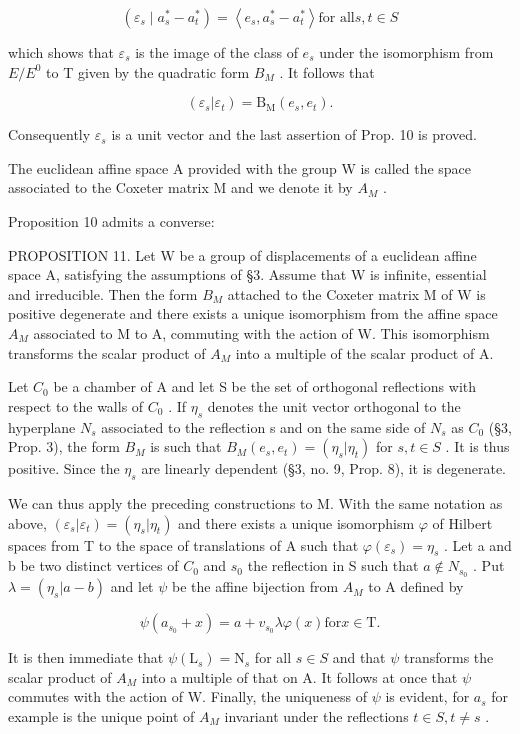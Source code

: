 \[
\left(\varepsilon_ {s} \mid a _ {s} ^ {*} - a _ {t} ^ {*}\right) = \left\langle e _ {s}, a _ {s} ^ {*} - a _ {t} ^ {*} \right\rangle \text {for all} s, t \in S
\]

which shows that \(\varepsilon_{s}\) is the image of the class of \(e_{s}\) under the isomorphism from \(E/E^{0}\) to T given by the quadratic form \(B_{M}\) . It follows that

\[
(\varepsilon_ {s} | \varepsilon_ {t}) = \mathrm{B} _ {\mathrm{M}} (e _ {s}, e _ {t}).
\]

Consequently \(\varepsilon_{s}\) is a unit vector and the last assertion of Prop. 10 is proved.

The euclidean affine space A provided with the group W is called the space associated to the Coxeter matrix M and we denote it by \(A_{M}\) .

Proposition 10 admits a converse:

PROPOSITION 11. Let W be a group of displacements of a euclidean affine space A, satisfying the assumptions of §3. Assume that W is infinite, essential and irreducible. Then the form \(B_{M}\) attached to the Coxeter matrix M of W is positive degenerate and there exists a unique isomorphism from the affine space \(A_{M}\) associated to M to A, commuting with the action of W. This isomorphism transforms the scalar product of \(A_{M}\) into a multiple of the scalar product of A.

Let \(C_0\) be a chamber of A and let S be the set of orthogonal reflections with respect to the walls of \(C_0\) . If \(\eta_s\) denotes the unit vector orthogonal to the hyperplane \(N_s\) associated to the reflection s and on the same side of \(N_s\) as \(C_0\) (§3, Prop. 3), the form \(B_M\) is such that \(B_M(e_s, e_t) = (\eta_s | \eta_t)\) for \(s, t \in S\) . It is thus positive. Since the \(\eta_s\) are linearly dependent (§3, no. 9, Prop. 8), it is degenerate.

We can thus apply the preceding constructions to M. With the same notation as above, \((\varepsilon_{s}|\varepsilon_{t}) = (\eta_{s}|\eta_{t})\) and there exists a unique isomorphism \(\varphi\) of Hilbert spaces from T to the space of translations of A such that \(\varphi(\varepsilon_{s}) = \eta_{s}\) . Let a and b be two distinct vertices of \(C_{0}\) and \(s_{0}\) the reflection in S such that \(a \notin N_{s_{0}}\) . Put \(\lambda = (\eta_{s}|a - b)\) and let \(\psi\) be the affine bijection from \(A_{M}\) to A defined by

\[
\psi \left(a _ {s _ {0}} + x\right) = a + v _ {s _ {0}} \lambda \varphi (x) \text {for} x \in \mathrm{T}.
\]

It is then immediate that \(\psi(\mathrm{L}_{s}) = \mathrm{N}_{s}\) for all \(s \in S\) and that \(\psi\) transforms the scalar product of \(A_{M}\) into a multiple of that on A. It follows at once that \(\psi\) commutes with the action of W. Finally, the uniqueness of \(\psi\) is evident, for \(a_{s}\) for example is the unique point of \(A_{M}\) invariant under the reflections \(t \in S, t \neq s\) .

